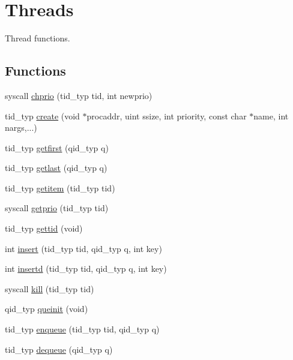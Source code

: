 \hypertarget{group__threads}{\section{Threads}
\label{group__threads}
}


Thread functions.  


\subsection*{Functions}
\begin{DoxyCompactItemize}
\item 
syscall \hyperlink{group__threads_ga2bfc2169e1e2e6a8f69863f2fbd49b08}{chprio} (tid\-\_\-typ tid, int newprio)
\item 
tid\-\_\-typ \hyperlink{group__threads_gadaf1066eaafe737bb19d120939ee0fb8}{create} (void $\ast$procaddr, uint ssize, int priority, const char $\ast$name, int nargs,...)
\item 
tid\-\_\-typ \hyperlink{group__threads_ga755c454d286d2321b99c3b4a0388ecc4}{getfirst} (qid\-\_\-typ q)
\item 
tid\-\_\-typ \hyperlink{group__threads_ga112be8829f3439d572c415a75ecad52c}{getlast} (qid\-\_\-typ q)
\item 
tid\-\_\-typ \hyperlink{group__threads_gac672647e3efaced96c3104af9b11762b}{getitem} (tid\-\_\-typ tid)
\item 
syscall \hyperlink{group__threads_gafd77d733c13214b040e1e6dcd9b5d69c}{getprio} (tid\-\_\-typ tid)
\item 
tid\-\_\-typ \hyperlink{group__threads_ga451762ead96954f0c9954c64db4831eb}{gettid} (void)
\item 
int \hyperlink{group__threads_gaeb1e855fcc190c3c30e8e64924939e4c}{insert} (tid\-\_\-typ tid, qid\-\_\-typ q, int key)
\item 
int \hyperlink{group__threads_gad203c57d47eaf6798acae5d1a89d8e91}{insertd} (tid\-\_\-typ tid, qid\-\_\-typ q, int key)
\item 
syscall \hyperlink{group__threads_gac05f6a9c7beeb6bcbac34900986638f8}{kill} (tid\-\_\-typ tid)
\item 
qid\-\_\-typ \hyperlink{group__threads_gaf975b3cd4a227de027177b456c912fd9}{queinit} (void)
\item 
tid\-\_\-typ \hyperlink{group__threads_gaab9d73203afebafae09523f14ed97903}{enqueue} (tid\-\_\-typ tid, qid\-\_\-typ q)
\item 
tid\-\_\-typ \hyperlink{group__threads_gace6175f210a255a0f9c19b57730eed6e}{dequeue} (qid\-\_\-typ q)

\end{DoxyCompactItemize}
